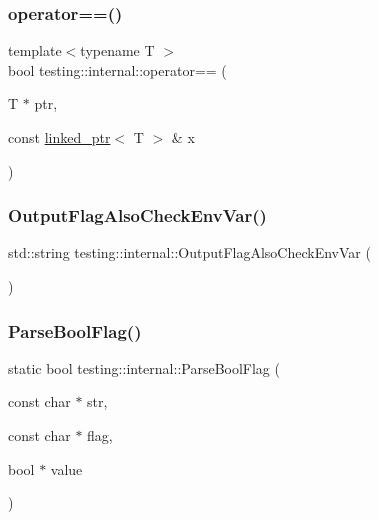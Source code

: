 \mbox{\label{namespacetesting_1_1internal_ad1cb54a206a209ddace17a05359d38ae}} 
\subsubsection{\texorpdfstring{operator==()}{operator==()}}
{\footnotesize\ttfamily template$<$typename T $>$ \\
bool testing\+::internal\+::operator== (\begin{DoxyParamCaption}\item[{T $\ast$}]{ptr,  }\item[{const \mbox{\hyperlink{classtesting_1_1internal_1_1linked__ptr}{linked\+\_\+ptr}}$<$ T $>$ \&}]{x }\end{DoxyParamCaption})\hspace{0.3cm}{\ttfamily [inline]}}

\mbox{\label{namespacetesting_1_1internal_a0c793c6d84760d900299916c077a1af4}} 
\subsubsection{\texorpdfstring{OutputFlagAlsoCheckEnvVar()}{OutputFlagAlsoCheckEnvVar()}}
{\footnotesize\ttfamily std\+::string testing\+::internal\+::\+Output\+Flag\+Also\+Check\+Env\+Var (\begin{DoxyParamCaption}{ }\end{DoxyParamCaption})}

\mbox{\label{namespacetesting_1_1internal_ac76619e6bb184bb1df258b08bc77cb6b}} 
\subsubsection{\texorpdfstring{ParseBoolFlag()}{ParseBoolFlag()}}
{\footnotesize\ttfamily static bool testing\+::internal\+::\+Parse\+Bool\+Flag (\begin{DoxyParamCaption}\item[{const char $\ast$}]{str,  }\item[{const char $\ast$}]{flag,  }\item[{bool $\ast$}]{value }\end{DoxyParamCaption})\hspace{0.3cm}{\ttfamily [static]}}

